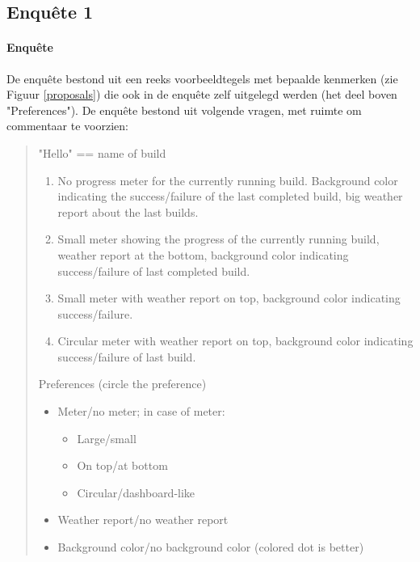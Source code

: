 \documentclass[10pt,a4paper]{article}
\begin{document}
\begin{appendices}
\section{Enqu\^ete 1}
\label{enquete1}
\paragraph{Enqu\^ete}
De enqu\^ete bestond uit een reeks voorbeeldtegels met bepaalde kenmerken (zie Figuur \ref{proposals}) die ook in de enqu\^ete zelf uitgelegd werden (het deel boven "Preferences"). De enqu\^ete bestond uit volgende vragen, met ruimte om commentaar te voorzien:\\

\begin{minipage}{1.1 \textwidth}
\begin{quote}
"Hello" == name of build
\begin{enumerate}
\item No progress meter for the currently running build. Background color indicating the success/failure of the last completed build, big weather report about the last builds.
\item Small meter showing the progress of the currently running build, weather report at the bottom, background color indicating success/failure of last completed build.
\item Small meter with weather report on top, background color indicating success/failure.
\item Circular meter with weather report on top, background color indicating success/failure of last build.
\end{enumerate}
Preferences (circle the preference)
\begin{itemize}
\item Meter/no meter; in case of meter:
\begin{itemize}
\item Large/small
\item On top/at bottom
\item Circular/dashboard-like
\end{itemize}
\item Weather report/no weather report
\item Background color/no background color (colored dot is better)
\end{itemize}
\end{quote}

\end{minipage}


\end{appendices}
\end{document}
